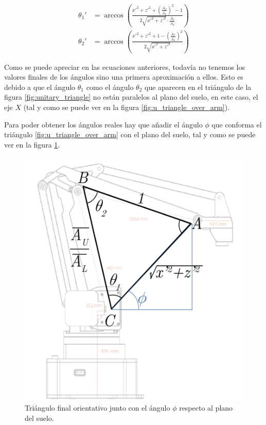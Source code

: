 \begin{align}
    \theta_1' & = \arccos{\left(\frac{x'^2 + z'^2 + \left(\frac{\overline{A_U}}{\overline{A_L}}\right)^2 - 1} %
    {2\sqrt{x'^2 + z'^2} \cdot \frac{\overline{A_U}}{\overline{A_L}}}\right)} \label{eq:t1}                   \\[2ex]
    \theta_2' & = \arccos{\left(\frac{x'^2 + z'^2 + 1 - \left(\frac{\overline{A_U}}{\overline{A_L}}\right)^2} %
        {2\sqrt{x'^2 + z'^2}}\right)} \label{eq:t2}
\end{align}

Como se puede apreciar en las ecuaciones anteriores, todavía no tenemos los valores finales
de los ángulos sino una primera aproximación a ellos. Esto es debido a que el ángulo
$\theta_1$ como el ángulo $\theta_2$ que aparecen en el triángulo de la figura \ref{fig:unitary_triangle}
no están paralelos al plano del suelo, en este caso, el eje $X$ (tal y como se puede ver
en la figura \ref{fig:u_triangle_over_arm}).

Para poder obtener los ángulos reales hay que añadir el ángulo $\phi$ que conforma el triángulo
\ref{fig:u_triangle_over_arm} con el plano del suelo, tal y como se puede ver en la figura
\ref{fig:final_triangle}.

\begin{figure}[H]
    \centering
    \includegraphics[width=.7\linewidth]{pictures/ik_final.png}
    \caption{Triángulo final orientativo junto con el ángulo $\phi$ respecto al plano del suelo.}
    \label{fig:final_triangle}
\end{figure}

